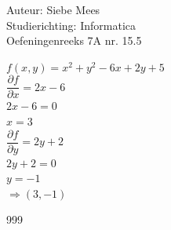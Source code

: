 \documentclass[a4paper]{article}
\begin{document}
  
\noindent \large Auteur: Siebe Mees \\
\noindent \large Studierichting: Informatica\\
\noindent \large Oefeningenreeks 7A nr. 15.5\\

\medskip

\normalsize

$f(x,y)=x^2+y^2-6x+2y+5$\\

$\dfrac{\partial f}{\partial x}=2x-6$\\

$ 2x-6=0$\\

$x=3$\\

$\dfrac{\partial f}{\partial y}=2y+2$\\

$2y+2=0$\\

$y=-1$\\

$\Rightarrow (3,-1)$\\


\begin{thebibliography}{999}
\end{thebibliography}
\end{document}
